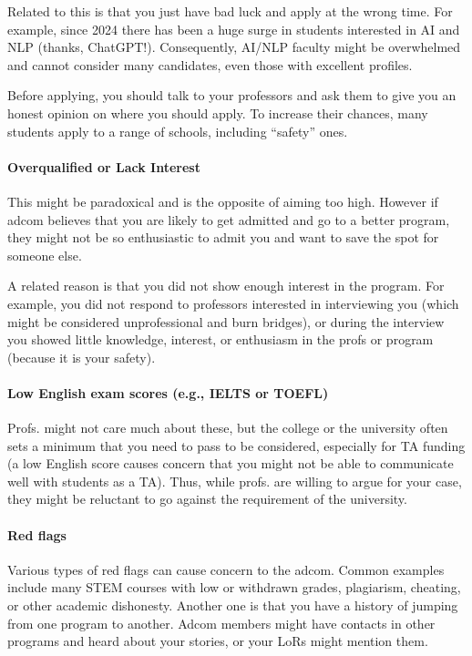 \documentclass[oneside,11pt,dvipsnames]{book}
\begin{document}
Related to this is that you just have bad luck and apply at the wrong time.  For example, since 2024 there has been a huge surge in students interested in AI and NLP (thanks, ChatGPT!). Consequently, AI/NLP faculty might be overwhelmed and cannot consider many candidates, even those with excellent profiles.



Before applying, you should talk to your professors and ask them to give you an honest opinion on where you should apply. To increase their chances, many students apply to a range of schools, including ``safety'' ones. 


\paragraph{Overqualified or Lack Interest}  This might be paradoxical and is the opposite of aiming too high. However if adcom believes that you are likely to get admitted and go to a better program, they might not be so enthusiastic to admit you and want to save the spot for someone else.

A related reason is that you did not show enough interest in the program.
For example, you did not respond to professors interested in interviewing you (which might be considered unprofessional and burn bridges), or during the interview you showed little knowledge, interest, or enthusiasm in the profs or program (because it is your safety). 

\paragraph{Low English exam scores (e.g., IELTS or TOEFL)}  Profs. might not care much about these, but the college or the university often sets a minimum that you need to pass to be considered, especially for TA funding (a low English score causes concern that you might not be able to communicate well with students as a TA).  Thus, while profs. are willing to argue for your case, they might be reluctant to go against the requirement of the university.




\paragraph{Red flags} Various types of red flags can cause concern to the adcom. Common examples include many STEM courses with low or withdrawn grades, plagiarism, cheating, or other academic dishonesty. Another one is that you have a history of jumping from one program to another. Adcom members might have contacts in other programs and heard about your stories, or your LoRs might mention them.
\end{document}
